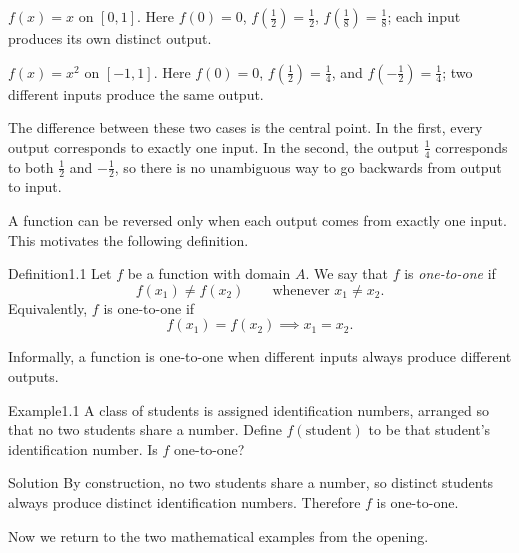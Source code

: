 \documentclass[a4paper,12pt,oneside]{memoir}
\begin{document}
\begin{warmuplist}
  \item \(f(x) = x\) on \([0, 1]\). Here \(f(0) = 0\), \(f(\tfrac{1}{2}) = \tfrac{1}{2}\), \(f(\tfrac{1}{8}) = \tfrac{1}{8}\); each input produces its own distinct output.
  \item \(f(x) = x^{2}\) on \([-1, 1]\). Here \(f(0) = 0\), \(f(\tfrac{1}{2}) = \tfrac{1}{4}\), and \(f(-\tfrac{1}{2}) = \tfrac{1}{4}\); two different inputs produce the same output.
\end{warmuplist}
The difference between these two cases is the central point. In the first, every output corresponds to exactly one input. In the second, the output \(\tfrac{1}{4}\) corresponds to both \(\tfrac{1}{2}\) and \(-\tfrac{1}{2}\), so there is no unambiguous way to go backwards from output to input.

A function can be reversed only when each output comes from exactly one input. This motivates the following definition.

\begin{envdefinition}{Definition}{1.1}{}
Let \(f\) be a function with domain \(A\). We say that \(f\) is \emph{one-to-one} if \[ f(x_{1}) \neq f(x_{2}) \qquad \text{whenever } x_{1} \neq x_{2}. \] Equivalently, \(f\) is one-to-one if \[ f(x_{1}) = f(x_{2}) \implies x_{1} = x_{2}. \]

\begin{informal}
Informally, a function is one-to-one when different inputs always produce different outputs.
\end{informal}
\end{envdefinition}
\begin{workedexample}
\begin{envexample}{Example}{1.1}{}
A class of students is assigned identification numbers, arranged so that no two students share a number. Define \(f(\mathrm{student})\) to be that student’s identification number. Is \(f\) one-to-one?
\end{envexample}
\begin{envsolution}{Solution}{}{}
By construction, no two students share a number, so distinct students always produce distinct identification numbers. Therefore \(f\) is one-to-one.
\end{envsolution}
\end{workedexample}
Now we return to the two mathematical examples from the opening.
\end{document}
